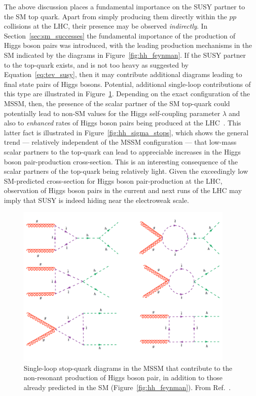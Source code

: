 The above discussion places a fundamental importance on the SUSY partner to the SM top quark.
Apart from simply producing them directly within the $pp$ collisions at the LHC,
their presence may be observed \textit{indirectly}.
In Section~\ref{sec:sm_successes} the fundamental importance of the production of Higgs boson
pairs was introduced, with the leading production mechanisms in the SM indicated
by the diagrams in Figure~\ref{fig:hh_feynman}.
If the SUSY partner to the top-quark exists, and is not too heavy as suggested by Equation~\ref{eq:tev_susy},
then it may contribute additional diagrams leading to final state
pairs of Higgs bosons.
Potential, additional single-loop contributions of this type are illustrated
in Figure~\ref{fig:hh_stops}.
Depending on the exact configuration of the MSSM, then, the presence of the scalar partner
of the SM top-quark could potentially lead to non-SM values for the Higgs self-coupling parameter $\lambda$ and
also to \textit{enhanced} rates of Higgs boson pairs
being produced at the LHC~\cite{LightStopsHiggs}.
This latter fact is illustrated in Figure~\ref{fig:hh_sigma_stops}, which shows the general
trend --- relatively independent of the MSSM configuration --- that low-mass scalar partners to the top-quark
can lead to appreciable increases in the Higgs boson pair-production cross-section.
This is an interesting consequence of the scalar partners of the top-quark being relatively
light.
Given the exceedingly low SM-predicted cross-section for Higgs boson pair-production at the LHC,
observation of Higgs boson pairs in the current and next runs of the LHC may imply that SUSY
is indeed hiding near the electroweak scale.

\begin{figure}[!htb]
    \begin{center}
        \includegraphics[width=0.95\textwidth]{figures/higgs_corr/hh_stopsPDF}
        \caption{
            Single-loop stop-quark diagrams in the MSSM that contribute to the non-resonant production
            of Higgs boson pair, in addition to those already predicted in the SM (Figure~\ref{fig:hh_feynman}). From Ref.~\cite{LightStopsHiggs}.
        }
        \label{fig:hh_stops}
    \end{center}
\end{figure}


